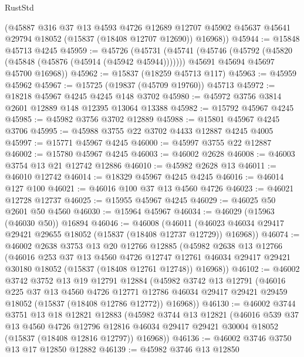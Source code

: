\begin{lexlean}{RustStd}
\begin{coremodule}
{\begin{coremodule}
{{{{{{{{{{{{{{{{{{{{{{{{{{{{{{{{{{{{{{{{{{{{{{{{{{{{{{{{{{{{      (@45887
        @316
        @37
        @13
        @4593
        @4726
        @12689
        @12707
        @45902
        @45637
        @45641
        @29794
        @18052
        (@15837 (@18408 @12707 @12690))
        @16968))
@45944 := @15848 @45713 @4245
@45959 := @45726
    (@45731
      (@45741
        (@45746 (@45792 (@45820 (@45848 (@45876 (@45914 (@45942 @45944)))))))
        @45691
        @45694
        @45697
        @45700
        @16968))
@45962 := @15837 (@18259 @45713 @117)
@45963 := @45959 @45962
@45967 := @15725 (@19837 (@45709 @19760)) @45713
@45972 := @18218 @45967 @4245 @4245 @148 @3702
@45980 := @45972 @3756 @3814 @2601 @12889 @148 @12395 @13064 @13388
@45982 := @15792 @45967 @4245
@45985 := @45982 @3756 @3702 @12889
@45988 := @15801 @45967 @4245 @3706
@45995 := @45988 @3755 @22 @3702 @4433 @12887 @4245 @4005
@45997 := @15771 @45967 @4245
@46000 := @45997 @3755 @22 @12887
@46002 := @15780 @45967 @4245
@46003 := @46002 @2628
@46008 := @46003 @3754 @13 @21 @12742 @12886
@46010 := @45982 @2628 @13
@46011 := @46010 @12742
@46014 := @18329 @45967 @4245 @4245
@46016 := @46014 @127 @100
@46021 := @46016 @100 @37 @13 @4560 @4726
@46023 := @46021 @12728 @12737
@46025 := @15955 @45967 @4245
@46029 := @46025 @50 @2601 @50 @4560
@46030 := @15964 @45967
@46034 := @46029 (@15963 (@46030 @50)) @16894
@46046 := @46008
    (@46011 (@46023 @46034 @29417 @29421 @29655 @18052 (@15837 (@18408 @12737 @12729)) @16968))
@46074 := @46002
    @2638
    @3753
    @13
    @20
    @12766
    @12885
    (@45982
      @2638
      @13
      @12766
      (@46016
        @253
        @37
        @13
        @4560
        @4726
        @12747
        @12761
        @46034
        @29417
        @29421
        @30180
        @18052
        (@15837 (@18408 @12761 @12748))
        @16968))
@46102 := @46002
    @3742
    @3752
    @13
    @19
    @12791
    @12884
    (@45982
      @3742
      @13
      @12791
      (@46016
        @225
        @37
        @13
        @4560
        @4726
        @12771
        @12786
        @46034
        @29417
        @29421
        @29459
        @18052
        (@15837 (@18408 @12786 @12772))
        @16968))
@46130 := @46002
    @3744
    @3751
    @13
    @18
    @12821
    @12883
    (@45982
      @3744
      @13
      @12821
      (@46016
        @539
        @37
        @13
        @4560
        @4726
        @12796
        @12816
        @46034
        @29417
        @29421
        @30004
        @18052
        (@15837 (@18408 @12816 @12797))
        @16968))
@46136 := @46002 @3746 @3750 @13 @17 @12850 @12882
@46139 := @45982 @3746 @13 @12850
}}}}}}}}}}}}}}}}}}}}}}}}}}}}}}}}}}}}}}}}}}}}}}}}}}}}}}}}}}}}
\end{coremodule}}
\end{coremodule}
\end{lexlean}
